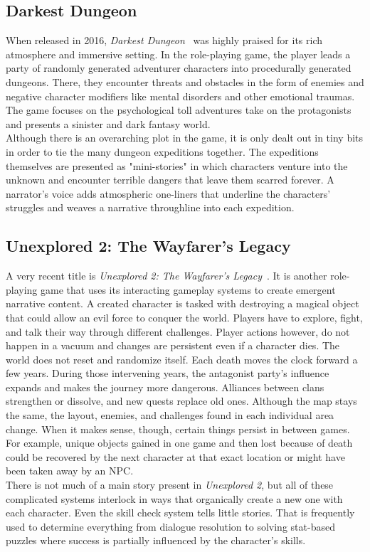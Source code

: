 \subsection{Darkest Dungeon}
When released in 2016, \textit{Darkest Dungeon}~\cite{dungeon} was highly praised for its rich atmosphere and immersive setting. In the role-playing game, the player leads a party of randomly generated adventurer characters into procedurally generated dungeons. There, they encounter threats and obstacles in the form of enemies and negative character modifiers like mental disorders and other emotional traumas. The game focuses on the psychological toll adventures take on the protagonists and presents a sinister and dark fantasy world.\\
Although there is an overarching plot in the game, it is only dealt out in tiny bits in order to tie the many dungeon expeditions together. The expeditions themselves are presented as "mini-stories" in which characters venture into the unknown and encounter terrible dangers that leave them scarred forever. A narrator's voice adds atmospheric one-liners that underline the characters' struggles and weaves a narrative throughline into each expedition.
\subsection{Unexplored 2: The Wayfarer's Legacy}
A very recent title is \textit{Unexplored 2: The Wayfarer's Legacy}~\cite{unexplored}. It is another role-playing game that uses its interacting gameplay systems to create emergent narrative content. A created character is tasked with destroying a magical object that could allow an evil force to conquer the world. Players have to explore, fight, and talk their way through different challenges. Player actions however, do not happen in a vacuum and changes are persistent even if a character dies. The world does not reset and randomize itself. Each death moves the clock forward a few years. During those intervening years, the antagonist party's influence expands and makes the journey more dangerous. Alliances between clans strengthen or dissolve, and new quests replace old ones. Although the map stays the same, the layout, enemies, and challenges found in each individual area change. When it makes sense, though, certain things persist in between games. For example, unique objects gained in one game and then lost because of death could be recovered by the next character at that exact location or might have been taken away by an NPC.\\
There is not much of a main story present in \textit{Unexplored 2}, but all of these complicated systems interlock in ways that organically create a new one with each character. Even the skill check system tells little stories. That is frequently used to determine everything from dialogue resolution to solving stat-based puzzles where success is partially influenced by the character's skills.
